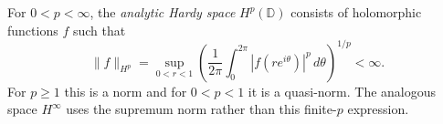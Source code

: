 
For $0<p<\infty$, the \emph{analytic Hardy space} $H^p(\mathbb D)$ consists of holomorphic functions $f$ such that
\[
\|f\|_{H^p}=\sup_{0<r<1}\left(\frac1{2\pi}\int_0^{2\pi}|f(re^{i\theta})|^p\,d\theta\right)^{1/p}<\infty.
\]
For $p\ge1$ this is a norm and for $0<p<1$ it is a quasi-norm. The analogous space $H^\infty$ uses the supremum norm rather than this finite-$p$ expression.
